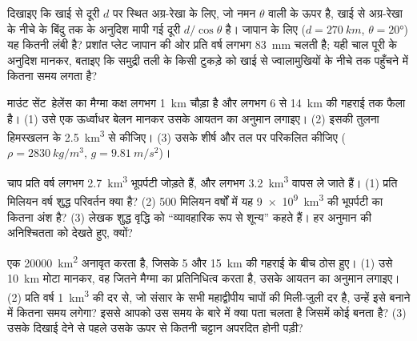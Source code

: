 \begin{exercise}[$\star\star\star$]\label{exo:g12:subduction-magmatism:12}
दिखाइए कि खाई से दूरी $d$ पर स्थित अग्र-रेखा के लिए, जो नमन
$\theta$ वाली  के ऊपर है, खाई से अग्र-रेखा के नीचे के बिंदु तक  के अनुदिश
मापी गई दूरी $d/\cos\theta$ है। जापान के लिए ($d = \qty{270}{km}$,
$\theta = \ang{20}$) यह कितनी लंबी है? प्रशांत प्लेट जापान की ओर
प्रति वर्ष लगभग \qty{83}{mm} चलती है; यही चाल पूरी  के अनुदिश मानकर, बताइए कि
समुद्री तली के किसी टुकड़े को खाई से ज्वालामुखियों के नीचे तक पहुँचने में कितना
समय लगता है?
\end{exercise}

\begin{exercise}[$\star\star\star$]\label{exo:g12:subduction-magmatism:13}
माउंट सेंट~हेलेंस का मैग्मा कक्ष लगभग \qty{1}{km} चौड़ा है और लगभग
6 से \qty{14}{km} की गहराई तक फैला है। (1) उसे एक ऊर्ध्वाधर बेलन मानकर
उसके आयतन का अनुमान लगाइए। (2) इसकी तुलना हिमस्खलन के \qty{2.5}{km^3} से कीजिए।
(3) उसके शीर्ष और तल पर  परिकलित कीजिए ($\rho =
\qty{2830}{kg/m^3}$, $g = \qty{9.81}{m/s^2}$)।
\end{exercise}

\begin{exercise}[$\star\star\star$]\label{exo:g12:subduction-magmatism:14}
चाप प्रति वर्ष लगभग \qty{2.7}{km^3} भूपर्पटी जोड़ते हैं, और 
लगभग \qty{3.2}{km^3} वापस ले जाते हैं। (1) प्रति मिलियन वर्ष शुद्ध परिवर्तन क्या है?
(2) 500 मिलियन वर्षों में यह \qty{9e9}{km^3} की भूपर्पटी का कितना अंश
है? (3) लेखक शुद्ध वृद्धि को ``व्यावहारिक रूप से शून्य'' कहते हैं। हर अनुमान की
अनिश्चितता को देखते हुए, क्यों?
\end{exercise}

\begin{exercise}[$\star\star\star$]\label{exo:g12:subduction-magmatism:15}
एक  \qty{20000}{km^2}  अनावृत करता है, जिसके 
5 और \qty{15}{km} की गहराई के बीच ठोस हुए। (1) उसे \qty{10}{km} मोटा मानकर,
वह जितने मैग्मा का प्रतिनिधित्व करता है, उसके आयतन का अनुमान लगाइए। (2) प्रति वर्ष \qty{1}{km^3} की दर से,
जो संसार के सभी महाद्वीपीय चापों की मिली-जुली दर है, उन्हें इसे बनाने में कितना
समय लगेगा? इससे आपको उस समय के बारे में क्या पता चलता है जिसमें कोई
 बनता है?
(3) उसके दिखाई देने से पहले उसके ऊपर से कितनी चट्टान अपरदित होनी पड़ी?
\end{exercise}

